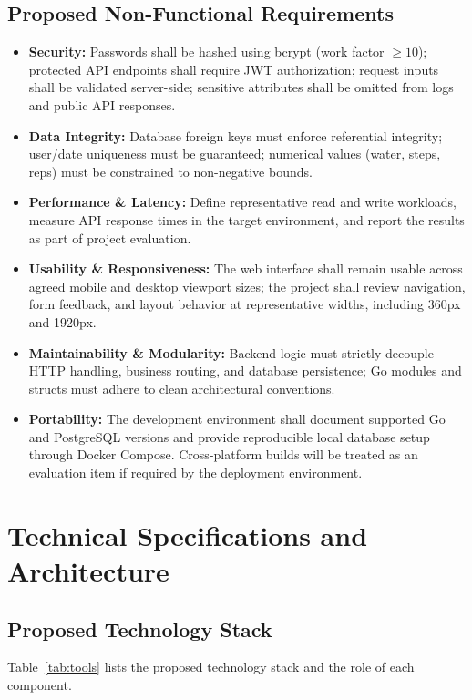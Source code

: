 \documentclass[11pt,a4paper]{report}
\begin{document}
\section{Proposed Non-Functional Requirements}
\begin{itemize}
  \item \textbf{Security:} Passwords shall be hashed using bcrypt (work factor $\ge 10$); protected API endpoints shall require JWT authorization; request inputs shall be validated server-side; sensitive attributes shall be omitted from logs and public API responses.
  \item \textbf{Data Integrity:} Database foreign keys must enforce referential integrity; user/date uniqueness must be guaranteed; numerical values (water, steps, reps) must be constrained to non-negative bounds.
  \item \textbf{Performance \& Latency:} Define representative read and write workloads, measure API response times in the target environment, and report the results as part of project evaluation.
  \item \textbf{Usability \& Responsiveness:} The web interface shall remain usable across agreed mobile and desktop viewport sizes; the project shall review navigation, form feedback, and layout behavior at representative widths, including 360px and 1920px.
  \item \textbf{Maintainability \& Modularity:} Backend logic must strictly decouple HTTP handling, business routing, and database persistence; Go modules and structs must adhere to clean architectural conventions.
  \item \textbf{Portability:} The development environment shall document supported Go and PostgreSQL versions and provide reproducible local database setup through Docker Compose. Cross-platform builds will be treated as an evaluation item if required by the deployment environment.
\end{itemize}

\chapter{Technical Specifications and Architecture}

\section{Proposed Technology Stack}
Table~\ref{tab:tools} lists the proposed technology stack and the role of each component.
\end{document}
